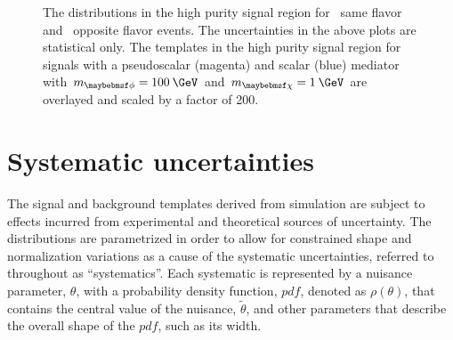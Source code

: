 \begin{figure}
  \caption{The \ptmiss distributions in the high purity signal region for~\protect{} same flavor and~\protect{} opposite flavor events. The uncertainties in the above plots are statistical only. The \ptmiss templates in the high purity signal region for signals with a pseudoscalar (magenta) and scalar (blue) mediator with $\mMed=100\:\GeV$ and $\mDM=1\:\GeV$ are overlayed and scaled by a factor of 200.}
  \label{fig:methi}
\end{figure}


\section{Systematic uncertainties}
\label{sec:systunc}

The signal and background \ptmiss templates derived from simulation are subject to effects incurred from experimental and theoretical sources of uncertainty. The \ptmiss distributions are parametrized in order to allow for constrained shape and normalization variations as a cause of the systematic uncertainties, referred to throughout as ``systematics''. Each systematic is represented by a nuisance parameter, $\theta$, with a probability density function, $pdf$, denoted as $\rho(\theta)$, that contains the central value of the nuisance, $\widetilde{\theta}$, and other parameters that describe the overall shape of the $pdf$, such as its width. 

